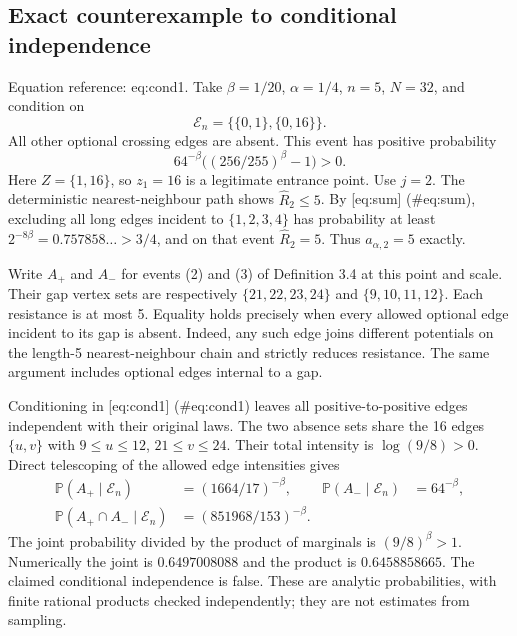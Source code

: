 \documentclass[10pt]{article}
\begin{document}
\subsection*{Exact counterexample to conditional independence}
Equation reference: eq:cond1. Take \(\beta=1/20\), \(\alpha=1/4\), \(n=5\), \(N=32\), and condition on \[
 \mathcal E_n=\{\{0,1\},\{0,16\}\}.\] All other optional crossing edges are absent. This event has positive probability \[64^{-\beta}\bigl((256/255)^\beta-1\bigr)>0.\] Here \(Z=\{1,16\}\), so \(z_1=16\) is a legitimate entrance point. Use \(j=2\). The deterministic nearest-neighbour path shows \(\widehat R_2\le5\). By [eq:sum] (\#eq:sum), excluding all long edges incident to \(\{1,2,3,4\}\) has probability at least \(2^{-8\beta}=0.757858\ldots>3/4\), and on that event \(\widehat R_2=5\). Thus \(a_{\alpha,2}=5\) exactly.\par
Write \(A_+\) and \(A_-\) for events (2) and (3) of Definition 3.4 at this point and scale. Their gap vertex sets are respectively \(\{21,22,23,24\}\) and \(\{9,10,11,12\}\). Each resistance is at most 5. Equality holds precisely when every allowed optional edge incident to its gap is absent. Indeed, any such edge joins different potentials on the length-5 nearest-neighbour chain and strictly reduces resistance. The same argument includes optional edges internal to a gap.\par
Conditioning in [eq:cond1] (\#eq:cond1) leaves all positive-to-positive edges independent with their original laws. The two absence sets share the 16 edges \(\{u,v\}\) with \(9\le u\le12\), \(21\le v\le24\). Their total intensity is \(\log(9/8)>0\). Direct telescoping of the allowed edge intensities gives \[\begin{aligned}
 \mathbb P(A_+\mid\mathcal E_n)&=(1664/17)^{-\beta},&
 \mathbb P(A_-\mid\mathcal E_n)&=64^{-\beta},\\
 \mathbb P(A_+\cap A_-\mid\mathcal E_n)&=(851968/153)^{-\beta}.\end{aligned}\] The joint probability divided by the product of marginals is \((9/8)^\beta>1\). Numerically the joint is \(0.6497008088\) and the product is \(0.6458858665\). The claimed conditional independence is false. These are analytic probabilities, with finite rational products checked independently; they are not estimates from sampling.\par
\end{document}
